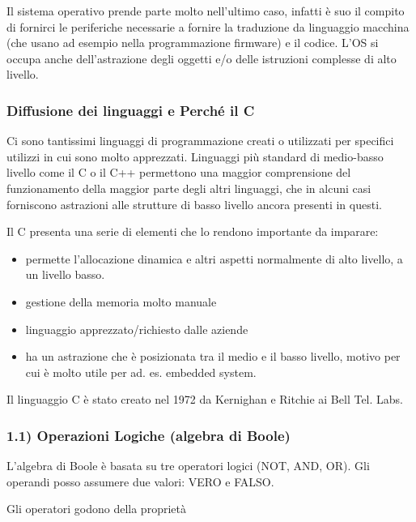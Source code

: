 \documentclass[
  paper=a4,
  oneside  ,captions=tableheading
]{scrbook}
\providecommand{\tightlist}{%
  \setlength{\itemsep}{0pt}\setlength{\parskip}{0pt}}
\begin{document}
Il sistema operativo prende parte molto nell'ultimo caso, infatti è suo
il compito di fornirci le periferiche necessarie a fornire la traduzione
da linguaggio macchina (che usano ad esempio nella programmazione
firmware) e il codice. L'OS si occupa anche dell'astrazione degli
oggetti e/o delle istruzioni complesse di alto livello.

\hypertarget{diffusione-dei-linguaggi-e-perchuxe9-il-c}{%
\subsubsection{Diffusione dei linguaggi e Perché il
C}\label{diffusione-dei-linguaggi-e-perchuxe9-il-c}}

Ci sono tantissimi linguaggi di programmazione creati o utilizzati per
specifici utilizzi in cui sono molto apprezzati. Linguaggi più standard
di medio-basso livello come il C o il C++ permettono una maggior
comprensione del funzionamento della maggior parte degli altri
linguaggi, che in alcuni casi forniscono astrazioni alle strutture di
basso livello ancora presenti in questi.

Il C presenta una serie di elementi che lo rendono importante da
imparare:

\begin{itemize}
\tightlist
\item
  permette l'allocazione dinamica e altri aspetti normalmente di alto
  livello, a un livello basso.
\item
  gestione della memoria molto manuale
\item
  linguaggio apprezzato/richiesto dalle aziende
\item
  ha un astrazione che è posizionata tra il medio e il basso livello,
  motivo per cui è molto utile per ad. es. embedded system.
\end{itemize}

Il linguaggio C è stato creato nel 1972 da Kernighan e Ritchie ai Bell
Tel. Labs.

\hypertarget{operazioni-logiche-algebra-di-boole}{%
\subsubsection{1.1) Operazioni Logiche (algebra di
Boole)}\label{operazioni-logiche-algebra-di-boole}}

L'algebra di Boole è basata su tre operatori logici (NOT, AND, OR). Gli
operandi posso assumere due valori: VERO e FALSO.

Gli operatori godono della proprietà
\end{document}
